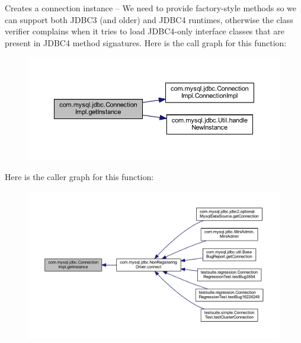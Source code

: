 Creates a connection instance -- We need to provide factory-\/style methods so we can support both J\+D\+B\+C3 (and older) and J\+D\+B\+C4 runtimes, otherwise the class verifier complains when it tries to load J\+D\+B\+C4-\/only interface classes that are present in J\+D\+B\+C4 method signatures. Here is the call graph for this function\+:\nopagebreak
\begin{figure}[H]
\begin{center}
\leavevmode
\includegraphics[width=350pt]{classcom_1_1mysql_1_1jdbc_1_1_connection_impl_afda2c6f126087c49737afee5bc053e32_cgraph}
\end{center}
\end{figure}
Here is the caller graph for this function\+:\nopagebreak
\begin{figure}[H]
\begin{center}
\leavevmode
\includegraphics[width=350pt]{classcom_1_1mysql_1_1jdbc_1_1_connection_impl_afda2c6f126087c49737afee5bc053e32_icgraph}
\end{center}
\end{figure}
\mbox{\label{classcom_1_1mysql_1_1jdbc_1_1_connection_impl_a4d22c7c85c9da8bc9ee56bd4e0ede41d}} 
